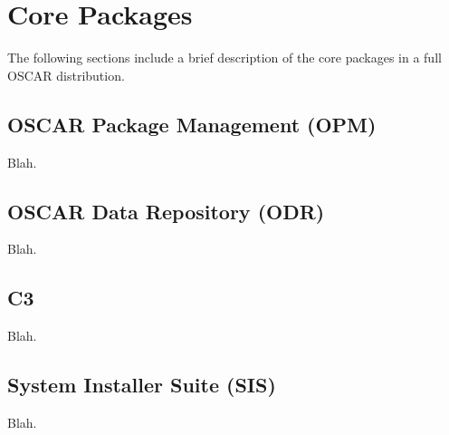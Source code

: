 %
%
%

\section{Core Packages}

The following sections include a brief description of the core
packages in a full OSCAR distribution.

\subsection{OSCAR Package Management (OPM)}

Blah.

\subsection{OSCAR Data Repository (ODR)}

Blah.

\subsection{C3}

Blah.

\subsection{System Installer Suite (SIS)}

Blah.
